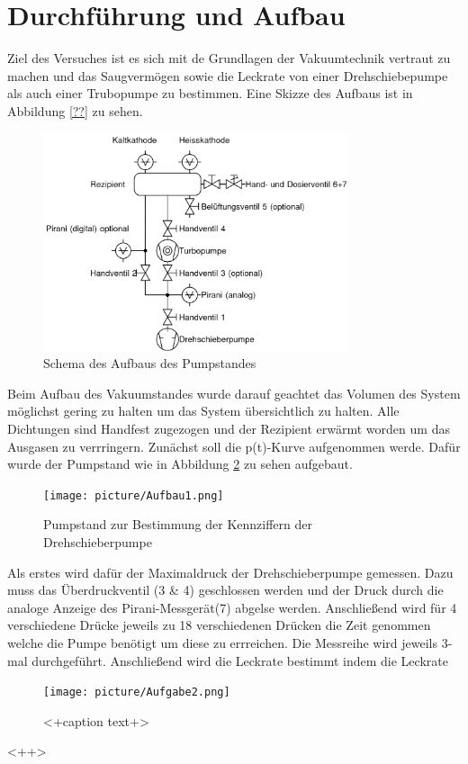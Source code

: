 \section{Durchführung und Aufbau}
\label{sec:Durchführung}
Ziel des Versuches ist es sich mit de Grundlagen der Vakuumtechnik vertraut zu machen und das Saugvermögen sowie die Leckrate von einer Drehschiebepumpe als auch einer Trubopumpe zu bestimmen. Eine Skizze des Aufbaus ist in Abbildung \ref{??} zu sehen. 
\begin{figure}[htpb]
  \centering
\includegraphics[width=0.8\textwidth]{picture/pumpaufbau.png}
  \caption{Schema des Aufbaus des Pumpstandes}
  \label{fig:pump}
\end{figure}
Beim Aufbau des Vakuumstandes wurde darauf geachtet das Volumen des System möglichst gering zu halten um das System übersichtlich zu halten. Alle Dichtungen sind Handfest zugezogen und der Rezipient erwärmt worden um das Ausgasen zu verrringern. \newline
Zunächst soll die p(t)-Kurve aufgenommen werde. Dafür wurde der Pumpstand wie in Abbildung \ref{fig:Dreh} zu sehen aufgebaut. 
\begin{figure}[htpb]
  \centering
  \texttt{[image: picture/Aufbau1.png]}
  \caption{Pumpstand zur Bestimmung der Kennziffern der Drehschieberpumpe}
  \label{fig:Dreh}
\end{figure}
Als erstes wird dafür der Maximaldruck der Drehschieberpumpe gemessen. Dazu muss das Überdruckventil (3 \& 4) geschlossen werden und der Druck durch die analoge Anzeige des Pirani-Messgerät(7) abgelse werden. Anschließend wird für 4 verschiedene Drücke jeweils zu 18 verschiedenen Drücken die Zeit genommen welche die Pumpe benötigt um diese zu errreichen. Die Messreihe wird jeweils 3-mal durchgeführt. 
Anschließend wird die Leckrate bestimmt indem die Leckrate 

\begin{figure}[htpb]
  \centering
  \texttt{[image: picture/Aufgabe2.png]}
  \caption{<+caption text+>}
  \label{fig:<+label+>}
\end{figure}<++>
